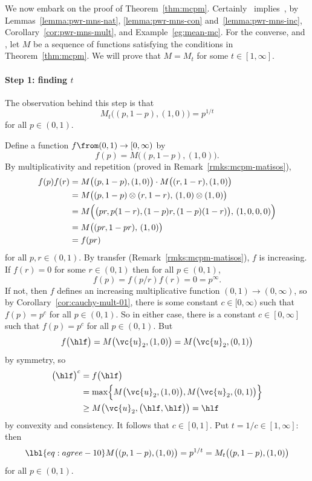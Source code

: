 We now embark on the proof of Theorem~\ref{thm:mcpm}.
Certainly~ implies~, by
Lemmas~\ref{lemma:pwr-mns-nat}, \ref{lemma:pwr-mns-con}
and~\ref{lemma:pwr-mns-inc}, Corollary~\ref{cor:pwr-mns-mult}, and
Example~\ref{eg:mean-mc}.  For the converse, and , let $M$ be a sequence of functions satisfying the
conditions in Theorem~\ref{thm:mcpm}.  We will prove
that $M = M_t$ for some $t \in [1, \infty]$.

\paragraph*{Step 1: finding $t$} 
The observation behind this step is that 
\[
M_t \bigl((p, 1 - p), (1, 0)\bigr) = p^{1/t}
\]
for all $p \in (0, 1)$. 

Define a function $f \from (0, 1) \to [0, \infty)$ by
\[
f(p) = M\bigl( (p, 1 - p), (1, 0) \bigr).
\]
By multiplicativity and repetition (proved in
Remark~\ref{rmks:mcpm-matisos}),
% 
\begin{align*}
f(p)f(r)        &
=
M\bigl( (p, 1 - p), (1, 0) \bigr)
\cdot
M\bigl( (r, 1 - r), (1, 0) \bigr)       \\
&
=
M\bigl( 
(p, 1 - p) \otimes (r, 1 - r), \, (1, 0) \otimes (1, 0)
\bigr)  \\
&
=
M\Bigl(
\bigl(pr, p(1 - r), (1 - p)r, (1 - p)(1 - r)\bigr), \, 
(1, 0, 0, 0)
\Bigr)  \\
&
=
M\bigl( (pr, 1 - pr), \, (1, 0) \bigr)  \\
&
=
f(pr)
\end{align*}
% 
for all $p, r \in (0, 1)$.  By transfer
(Remark~\ref{rmks:mcpm-matisos}),  $f$ is
increasing.  If $f(r) = 0$ for some $r \in (0, 1)$ then for all $p \in (0,
1)$, 
\[
f(p)
=
f(p/r) f(r)
=
0 
=
p^\infty.
\]
If not, then $f$ defines an increasing multiplicative function $(0, 1) \to
(0, \infty)$, so by Corollary~\ref{cor:cauchy-mult-01}, there is some
constant $c \in [0, \infty)$ such that $f(p) = p^c$ for all $p \in (0, 1)$.
  So in either case, there is a constant $c \in [0, \infty]$ such that
  $f(p) = p^c$ for all $p \in (0, 1)$.  But
\[
f\bigl(\hlf\bigr)
=
M\bigl( \vc{u}_2, (1, 0) \bigr)
=
M\bigl( \vc{u}_2, (0, 1) \bigr)
\]
by symmetry, so 
% 
\begin{align*}
\bigl(\hlf\bigr)^c        &
=
f\bigl(\hlf\bigr) \\
&
=
\max\Bigl\{
M\bigl( \vc{u}_2, (1, 0) \bigr),
M\bigl( \vc{u}_2, (0, 1) \bigr) 
\Bigr\} \\
&
\geq
M\bigl( \vc{u}_2, \bigl(\hlf, \hlf\bigr) \bigr)
=
\hlf
\end{align*}
% 
by convexity and consistency.  It follows that $c \in [0, 1]$.  Put $t =
1/c \in [1, \infty]$: then
%  
\begin{equation}
\lbl{eq:agree-10}
M\bigl( (p, 1 - p), (1, 0) \bigr)
=
p^{1/t}
=
M_t \bigl( (p, 1 - p), (1, 0) \bigr)
\end{equation}
% 
for all $p \in (0, 1)$.

